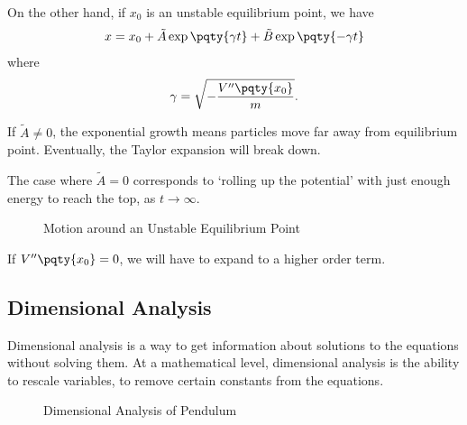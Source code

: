 On the other hand, if \(x_0\) is an unstable equilibrium point, we have
\begin{equation}
    x = x_0 + \tilde{A} \exp \pqty{\gamma t} + \tilde{B} \exp \pqty{- \gamma t}
\end{equation}
where
\begin{equation}
    \gamma = \sqrt{- \frac{V''\pqty{x_0}}{m}}.
\end{equation}

If \(\tilde{A} \neq 0\), the exponential growth means particles move far away from equilibrium point. Eventually, the Taylor expansion will break down.

The case where \(\tilde{A} = 0\) corresponds to `rolling up the potential' with just enough energy to reach the top, as \(t \to \infty\).

\begin{figure}[ht!]
    \centering

    \caption{Motion around an Unstable Equilibrium Point}
    \label{fig:motion-around-unstable-equilibrium-point}%
\end{figure}

If \(V''\pqty{x_0} = 0\), we will have to expand to a higher order term.

\subsection{Dimensional Analysis}

Dimensional analysis is a way to get information about solutions to the equations without solving them. At a mathematical level, dimensional analysis is the ability to rescale variables, to remove certain constants from the equations.

\begin{figure}[ht!]
    \centering

    \caption{Dimensional Analysis of Pendulum}
    \label{fig:dimensional-analysis-pendulum}%
\end{figure}


